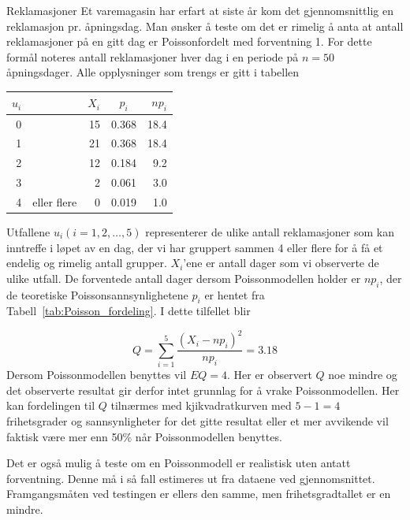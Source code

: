 \begin{eksempel}{Reklamasjoner}
Et varemagasin har erfart at siste år kom det gjennomsnittlig en
reklamasjon pr. åpningsdag. Man ønsker å teste om det er rimelig
å anta at antall reklamasjoner på en gitt dag er Poissonfordelt
med forventning 1. For dette formål noteres antall reklamasjoner
hver dag i en periode på $n=50$ åpningsdager. Alle opplysninger
som trengs er gitt i tabellen

\begin{center}
\begin{tabular}{rlrcr}
 $u_i$&            & $X_i$ & $p_i$ & $np_i$ \\ \hline
   0  &            &   15  & 0.368 &  18.4  \\
   1  &            &   21  & 0.368 &  18.4  \\
   2  &            &   12  & 0.184 &   9.2  \\
   3  &            &    2  & 0.061 &   3.0  \\
   4  & eller flere&    0  & 0.019 &   1.0  \\ \hline
\end{tabular}
\end{center}
Utfallene $u_i (i=1,2,\ldots ,5)$ representerer de ulike antall
reklamasjoner som kan inntreffe i løpet av en dag, der vi har
gruppert sammen 4 eller flere for å få et endelig og
rimelig antall grupper. $X_i$'ene er antall dager som vi
observerte de ulike utfall. De forventede antall dager dersom
Poisson\-modellen holder er $np_i$, der de teoretiske
Poissonsannsynlighetene $p_i$ er hentet fra Tabell~\ref{tab:Poisson_fordeling}. I dette
tilfellet blir

\[ Q=\sum_{i=1}^{5}\frac{{(X_i-np_i)}^2}{np_i} =3.18 \]
Dersom Poissonmodellen benyttes vil $EQ=4$. Her er observert $Q$
noe mindre og det observerte resultat gir derfor intet grunnlag
for å vrake Poissonmodellen. Her kan fordelingen til $Q$
tilnærmes med kjikvadratkurven med $5-1=4$ frihetsgrader og
sannsynligheter for det gitte resultat eller et mer avvikende vil
faktisk være mer enn 50\% når Poissonmodellen benyttes.

Det er også mulig å teste om en Poissonmodell er realistisk uten antatt
forventning. Denne må i så fall
estimeres ut fra dataene ved gjennomsnittet. Framgangsmåten ved testingen
er ellers den samme, men frihetsgradtallet er en mindre. \\
\end{eksempel}


